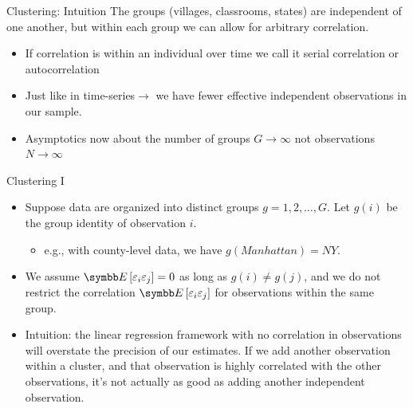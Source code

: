 \documentclass[aspectratio=169,11pt]{beamer}
\begin{document}
\begin{frame}{Clustering: Intuition}
The groups (villages, classrooms, states) are independent of one another, but within each group we can allow for arbitrary correlation.
\begin{itemize}
\item If correlation is within an individual over time we call it \alert{serial correlation} or \alert{autocorrelation}
\item Just like in time-series$\rightarrow$ we have fewer effective independent observations in our sample.
\item Asymptotics now about the number of groups $G \rightarrow \infty$ not observations $N \rightarrow \infty$
\end{itemize}
\end{frame}


\begin{frame}{Clustering I}
\begin{itemize}
	\item Suppose data are organized into distinct groups $g=1,2,\dots,G$. Let $g\left(i\right)$
	be the group identity of observation $i$. 
	\begin{itemize}
		\item e.g., with county-level data, we have $g\left(Manhattan\right)=NY$.
	\end{itemize}


	\medskip
	\item We assume $\E\left[\varepsilon_i \varepsilon_j\right]=0$ as long as $g\left(i\right)\ne g\left(j\right)$,
	and we do not restrict the correlation $\E\left[\varepsilon_i \varepsilon_j\right]$
	for observations within the same group.

	\medskip
	\item Intuition: the linear regression framework with no correlation in observations will overstate
	the precision of our estimates. If we add another observation within a cluster, and that observation
	is highly correlated with the other observations, it's not actually as good as adding another independent observation. 
\end{itemize}
\end{frame}
\end{document}
